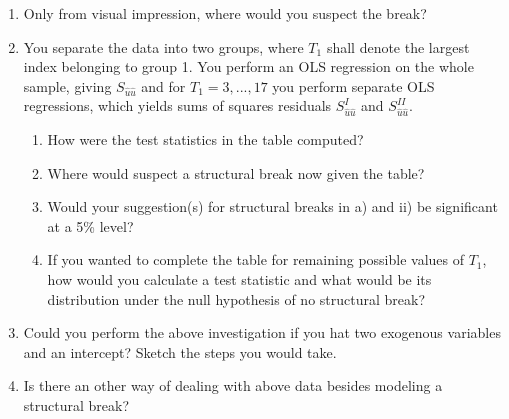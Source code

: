 \documentclass[captions=tableheading, 12pt, headings=small, parskip=half]{scrartcl}
\begin{document}
\begin{enumerate}[label = \alph*)]
	\item Only from visual impression, where would you suspect the break?
	\item You separate the data into two groups, where $T_1$ shall denote the largest index belonging to group 1. You perform an OLS regression on the whole sample, giving $S_{\hat{u}\hat{u}}$ and for $T_1 = 3,...,17$ you perform separate OLS regressions, which yields sums of squares residuals $S_{\hat{u}\hat{u}}^I$ and $S_{\hat{u}\hat{u}}^{II}$.
	\begin{table}[H]
		\centering
	\end{table}
	\begin{enumerate}[label = \roman*)]
		\item How were the test statistics in the table computed?
		\item Where would suspect a structural break now given the table?
		\item Would your suggestion(s) for structural breaks in a) and ii) be significant at a 5\% level?
		\item If you wanted to complete the table for remaining possible values of $T_1$, how would you calculate a test statistic and what would be its distribution under the null hypothesis of no structural break?
	\end{enumerate}
	\item Could you perform the above investigation if you hat two exogenous variables and an intercept? Sketch the steps you would take.
	\item Is there an other way of dealing with above data besides modeling a structural break?
\end{enumerate} 
\end{document}
